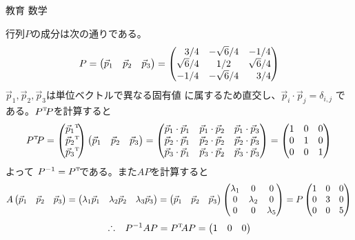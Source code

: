 \documentclass[fleqn]{jbook}
\begin{document}
\begin{answer}{教育 数学}{}
\begin{subanswers}
\begin{subsubanswers}
  \SubSubAnswer
    行列$P$の成分は次の通りである。
%
    \[ P = \vectT{\vec{p}_1}{\vec{p}_2}{\vec{p}_3}
         = \begin{pmatrix}
            \hfill 3/4 & -\sqrt{6}/4 & -1/4       \\
            \sqrt{6}/4 &  1/2        & \sqrt{6}/4 \\
            -1/4       & -\sqrt{6}/4 & \hfill 3/4 \end{pmatrix} \]
%
    $\vec{p}_1 ,\vec{p}_2 ,\vec{p}_3 $は単位ベクトルで異なる固有値
    に属するため直交し、$\vec{p}_i \cdot \vec{p}_j=\delta_{i,j}$
    である。$\Trans{P}P$を計算すると
%
    \[ \Trans{P}P%
       = \vect{\Trans{\vec{p}_1}}{\Trans{\vec{p}_2}}{\Trans{\vec{p}_3}}
         \vectT{\vec{p}_1}{\vec{p}_2}{\vec{p}_3}
       = \begin{pmatrix}
           \vec{p}_1\cdot\vec{p}_1 &
           \vec{p}_1\cdot\vec{p}_2 &
           \vec{p}_1\cdot\vec{p}_3 \\
           \vec{p}_2\cdot\vec{p}_1 &
           \vec{p}_2\cdot\vec{p}_2 &
           \vec{p}_2\cdot\vec{p}_3 \\
           \vec{p}_3\cdot\vec{p}_1 &
           \vec{p}_3\cdot\vec{p}_2 &
           \vec{p}_3\cdot\vec{p}_3 \end{pmatrix}
       = \begin{pmatrix}
           1 & 0 & 0 \\
           0 & 1 & 0 \\
           0 & 0 & 1 \end{pmatrix} \]
%
    よって $P^{-1}=\Trans{P}$である。また$AP$を計算すると
%
    \[ A\vectT{\vec{p}_1}{\vec{p}_2}{\vec{p}_3}
       = \vectT{\lambda_1\vec{p}_1}%
               {\lambda_2\vec{p}_2}%
               {\lambda_3\vec{p}_3}%
       = \vectT{\vec{p}_1}{\vec{p}_2}{\vec{p}_3}%
         \begin{pmatrix}
           \lambda_1 & 0         & 0         \\
           0         & \lambda_2 & 0         \\
           0         & 0         & \lambda_5 \end{pmatrix}
       = P%
         \begin{pmatrix}
           1 & 0 & 0 \\
           0 & 3 & 0 \\
           0 & 0 & 5 \end{pmatrix} \]
%
    \[ \Yueni P^{-1} A P = \Trans{P} A P =
          \begin{pmatrix}
            1 & 0 & 0 \\

\end{pmatrix}\]
\end{subsubanswers}
\end{subanswers}
\end{answer}
\end{document}
